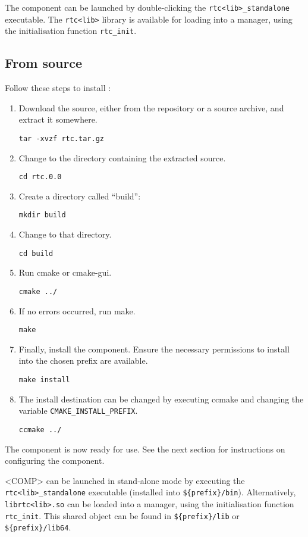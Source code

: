 \documentclass[a4paper,10pt]{article}
\newcommand{\ilcode}[1]{\lstinline|#1|}
\begin{document}
The component can be launched by double-clicking the
\ilcode{rtc<lib>_standalone} executable. The \ilcode{rtc<lib>} library
is available for loading into a manager, using the initialisation function
\ilcode{rtc_init}.

\subsection{From source}

Follow these steps to install :

\begin{enumerate}
  \item Download the source, either from the repository or a source archive,
  and extract it somewhere.

  \ilcode{tar -xvzf rtc.tar.gz}
  \item Change to the directory containing the extracted source.

  \ilcode{cd rtc.0.0}
  \item Create a directory called ``build'':

  \ilcode{mkdir build}
  \item Change to that directory.

  \ilcode{cd build}
  \item Run cmake or cmake-gui.

  \ilcode{cmake ../}
  \item If no errors occurred, run make.

  \ilcode{make}
  \item Finally, install the component. Ensure the necessary permissions to
  install into the chosen prefix are available.

  \ilcode{make install}
  \item The install destination can be changed by executing ccmake and changing
  the variable \ilcode{CMAKE_INSTALL_PREFIX}.

  \ilcode{ccmake ../}
\end{enumerate}

The component is now ready for use. See the next section for instructions on
configuring the component.

<COMP> can be launched in stand-alone mode by executing the
\ilcode{rtc<lib>_standalone} executable (installed into \ilcode{${prefix}/bin}).
Alternatively, \ilcode{librtc<lib>.so} can be loaded into a manager, using the
initialisation function \ilcode{rtc_init}. This shared object can be found in
\ilcode{${prefix}/lib} or \ilcode{${prefix}/lib64}.
\end{document}
